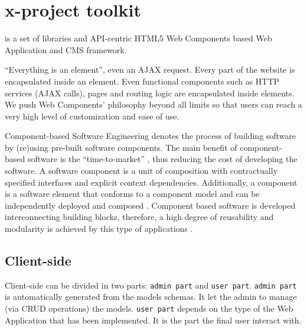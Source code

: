 \section{x-project toolkit}\label{sec:toolkit}
 is a set of libraries and API-centric HTML5 Web Components based Web Application and CMS framework.



``Everything is an element'', even an AJAX request. Every part of the website is encapsulated inside an element. Even functional components such as HTTP services (AJAX calls), pages and routing logic are encapsulated inside elements. We push Web Components' philosophy beyond all limits so that users can reach a very high level of customization and ease of use.

Component-based Software Engineering denotes the process of building software by (re)using pre-built software components. The main benefit of component-based software is the ``time-to-market'' \cite{4773208}, thus reducing the cost of developing the software. A software component is a unit of composition with contractually specified interfaces and explicit context dependencies. 
Additionally, a component is a software element that conforms to a component model and can be independently deployed and composed \cite{Heineman:2001:CSE:379381}. 
Component based software is developed interconnecting building blocks, therefore, a high degree of reusability and modularity is achieved by this type of applications \cite{914739}. 






\subsection{Client-side}

Client-side can be divided in two parts: \texttt{admin part} and \texttt{user part}.
\texttt{admin part} is automatically generated from the models schemas. It let the admin to manage (via CRUD operations) the models.
\texttt{user part} depends on the type of the Web Application that has been implemented.
It is the part the final user interact with.


